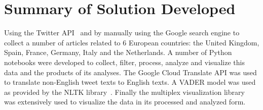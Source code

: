 %
%

\section{Summary of Solution Developed}
Using the Twitter \ac{API}~\citep{roesslein2020tweepy} and by manually using the Google search engine to collect a number of articles related to 6 European countries: the United Kingdom, Spain, France, Germany, Italy and the Netherlands.
A number of Python notebooks were developed to collect, filter, process, analyze and visualize this data and the products of its analyses.
The Google Cloud Translate \ac{API} was used to translate non-English tweet texts to English texts.
A \ac{VADER} model was used as provided by the \ac{NLTK} library~\citep{bird2009natural}.
Finally the multiplex visualization library~\citep{Mamo2021} was extensively used to visualize the data in its processed and analyzed form.

%
%


%
%

